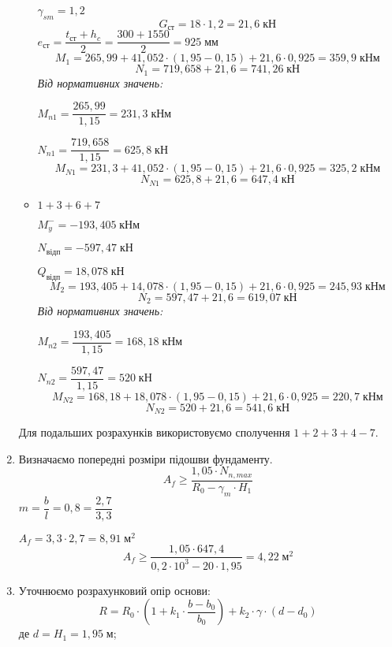 \documentclass[a4paper,14pt]{article}
\begin{document}
\begin{enumerate}
\begin{itemize}
       $\gamma_{sm} = 1,2$
       $$G_{\textit{ст}} = 18 \cdot 1,2 = 21,6\;\textit{кН}$$
       $e_{\textit{ст}} = \dfrac{t_{\textit{ст}} + h_c}{2} = \dfrac{300 + 1550}{2} = 925\;\textit{мм}$
       $$M_1 = 265,99 + 41,052 \cdot (1,95 - 0,15) + 21,6 \cdot 0,925 = 359,9\;\textit{кНм}$$
       $$N_1 = 719,658 + 21,6 = 741,26\;\textit{кН}$$
       \textit{Від нормативних значень:}
   
       $M_{n1} = \dfrac{265,99}{1,15} = 231,3\;\textit{кНм}$
   
       $N_{n1} = \dfrac{719,658}{1,15} = 625,8\;\textit{кН}$
       $$M_{N1} = 231,3 + 41,052 \cdot (1,95 - 0,15) + 21,6 \cdot 0,925 = 325,2\;\textit{кНм}$$
       $$N_{N1} = 625,8 + 21,6 = 647,4\;\textit{кН}$$
       \item $1 + 3 + 6 + 7$

        $M_y^- = - 193,405\;\textit{кНм}$
        
        $N_{\textit{відп}} = - 597,47\;\textit{кН}$
   
        $Q_{\textit{відп}} = 18,078\;\textit{кН}$
       $$M_2 = 193,405 + 14,078 \cdot (1,95 - 0,15) + 21,6 \cdot 0,925 = 245,93\;\textit{кНм}$$
       $$N_2 = 597,47 + 21,6 = 619,07\;\textit{кН}$$
       \textit{Від нормативних значень:}
   
       $M_{n2} = \dfrac{193,405}{1,15} = 168,18\;\textit{кНм}$
   
       $N_{n2} = \dfrac{597,47}{1,15} = 520\;\textit{кН}$
       $$M_{N2} = 168,18 + 18,078 \cdot (1,95 - 0,15) + 21,6 \cdot 0,925 = 220,7\;\textit{кНм}$$
       $$N_{N2} = 520 + 21,6 = 541,6\;\textit{кН}$$
    \end{itemize}
     Для подальших розрахунків використовуємо сполучення $1 + 2 + 3 + 4 - 7$.
    \item Визначаємо попередні розміри підошви фундаменту.
    \begin{equation}
        A_f \geqslant \dfrac{1,05 \cdot N_{n,max}}{R_0 - \gamma_m \cdot H_1}
    \end{equation}
     $m = \dfrac{b}{l} = 0,8 = \dfrac{2,7}{3,3}$

     $A_f = 3,3 \cdot 2,7 = 8,91\;\textit{м}^2$
     $$A_f \geqslant \dfrac{1,05 \cdot 647,4}{0,2 \cdot 10^3 - 20 \cdot 1,95} = 4,22\;\textit{м}^2$$
    \item Уточнюємо розрахунковий опір основи:
    \begin{equation}
        R = R_0 \cdot \left(1 + k_1 \cdot \dfrac{b-b_0}{b_0}\right) + k_2 \cdot \gamma \cdot \left(d - d_0\right)
    \end{equation}
    де $d = H_1 = 1,95\;\textit{м}$;


\end{enumerate}
\end{document}
